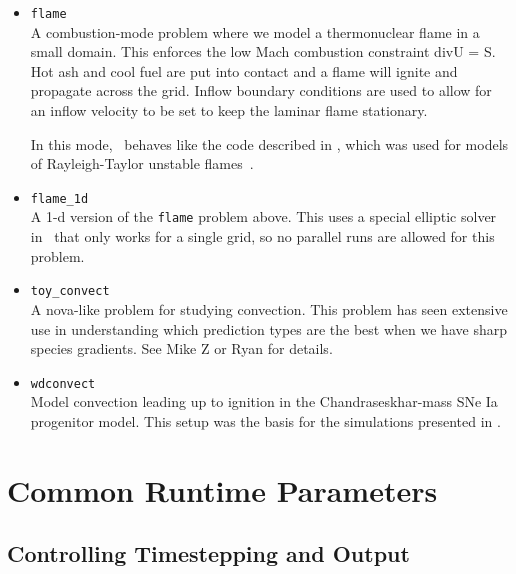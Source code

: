 \begin{itemize}

\item {\tt flame} \\[-3mm]

   A combustion-mode problem where we model a thermonuclear flame in a
   small domain.  This enforces the low Mach combustion constraint
   div{U} = S.  Hot ash and cool fuel are put into contact and a flame
   will ignite and propagate across the grid.  Inflow boundary
   conditions are used to allow for an inflow velocity to be set to
   keep the laminar flame stationary.

   In this mode, \maestro\ behaves like the code described
   in \cite{SNe}, which was used for models of Rayleigh-Taylor
   unstable flames~\cite{SNld,SNrt,SNrt3d}.

\item {\tt flame\_1d} \\[-3mm]

   A 1-d version of the {\tt flame} problem above.  This uses a special
   elliptic solver in \boxlib\ that only works for a single grid, so
   no parallel runs are allowed for this problem.
   
\item {\tt toy\_convect} \\[-3mm]

A nova-like problem for studying convection.  This problem has seen
extensive use in understanding which prediction types are the best
when we have sharp species gradients.  See Mike Z or Ryan for details.

\item {\tt wdconvect} \\[-3mm]

Model convection leading up to ignition in the Chandraseskhar-mass SNe
Ia progenitor model.  This setup was the basis for the simulations
presented in \cite{lowMach4,wdconvect,wdturb}.


\end{itemize}


\section{Common Runtime Parameters}
\label{sec:gettingstarted:runtime}

\subsection{Controlling Timestepping and Output}

